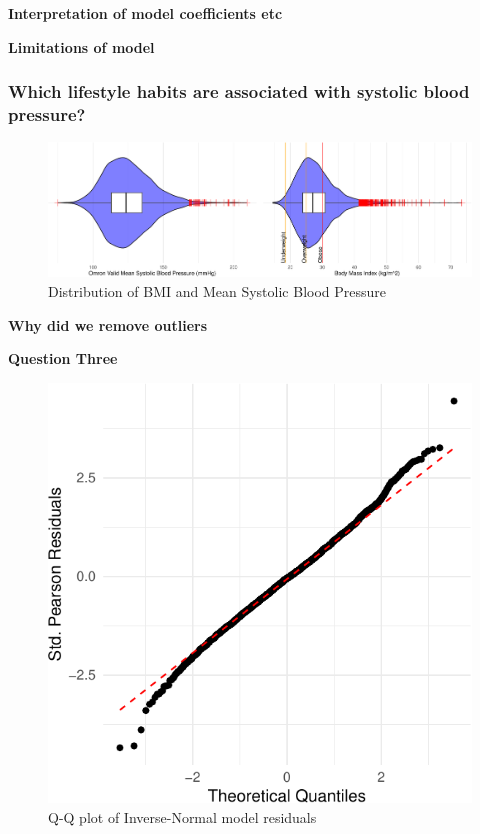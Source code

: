 \documentclass[
  11pt,
]{article}
\begin{document}
\textbf{Interpretation of model coefficients etc}

\textbf{Limitations of model}

\subsubsection{Which lifestyle habits are associated with systolic blood
pressure?}\label{which-lifestyle-habits-are-associated-with-systolic-blood-pressure}

\begin{figure}[H]
\includegraphics{Coursework_files/figure-latex/output distribution plots-1} \caption{Distribution of BMI and Mean Systolic Blood Pressure}\label{fig:output distribution plots}
\end{figure}

\textbf{Why did we remove outliers}

\textbf{Question Three}

\begin{figure}[H]

{\centering \includegraphics{Coursework_files/figure-latex/output qq plot for q3-1} 

}

\caption{Q-Q plot of Inverse-Normal model residuals}\label{fig:output qq plot for q3}
\end{figure}
\end{document}
